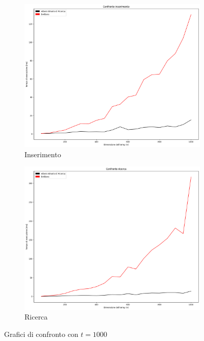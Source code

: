 \begin{figure}[H]
    \centering
    \begin{subfigure}[b]{0.49\textwidth}
        \centering
        \includegraphics[width=\textwidth]{comparison-graphs/insert-ms-t1000.png}
        \caption{Inserimento}
        \label{fig:compgraphinserttimet1000}
    \end{subfigure}
    \hfill
    \begin{subfigure}[b]{0.49\textwidth}
        \centering
        \includegraphics[width=\textwidth]{comparison-graphs/search-ms-t1000.png}
        \caption{Ricerca}
        \label{fig:compgraphsearchtimet1000}
    \end{subfigure}
    \caption{Grafici di confronto con $t=1000$}
    \label{fig:compgraphtimest1000}
\end{figure}

